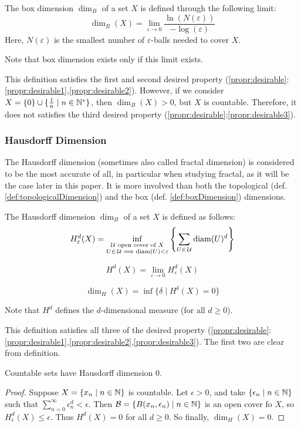 \begin{definition}\label{def:boxDimension}
	The box dimension $\dim_B$ of a set $X$ is defined through the following limit:
	$$
	\dim_B(X) = \lim_{\varepsilon \to 0} \frac{\ln(N(\varepsilon))}{-\log(\varepsilon)}
	$$
	Here, $N(\varepsilon)$ is the smallest number of $\varepsilon$-balls needed to cover $X$.
	
	Note that box dimension exists only if this limit exists.
\end{definition}

This definition satisfies the first and second desired property (\ref{propr:desirable}:\ref{propr:desirable1},\ref{propr:desirable2}).
However, if we consider $X = \{0\} \cup \{\frac{1}{n} \mid n \in \mathbb{N}^*\}$, then $\dim_B(X) > 0$, but $X$ is countable.
Therefore, it does not satisfies the third desired property (\ref{propr:desirable}:\ref{propr:desirable3}).

\subsubsection{Hausdorff Dimension}
The Hausdorff dimension (sometimes also called fractal dimension) is considered to be the most accurate of all, in particular when studying fractal, as it will be the case later in this paper.
It is more involved than both the topological (def. \ref{def:topologicalDimension}) and the box (def. \ref{def:boxDimension}) dimensions.

\begin{definition}\label{def:HausdorffDimension}
	The Hausdorff dimension $\dim_B$ of a set $X$ is defined as follows:
	$$
	H_{\varepsilon}^d(X) = 
	\inf_{\substack{\mathcal{U} \text{ open cover of } X\\
			U \in \, \mathcal{U} \implies \text{diam}(U) < \varepsilon}}
		\left\lbrace \sum_{U \in \, \mathcal{U}} \text{diam}(U)^d \right\rbrace
	$$
	
	$$
	H^d(X) = \lim_{\varepsilon \to 0} H_{\varepsilon}^d(X)
	$$
	
	$$
	\dim_H(X) = \inf \{ \delta \mid H^{\delta}(X) = 0 \}
	$$
	
	Note that $H^d$ defines the $d$-dimensional measure (for all $d \geq 0$).
\end{definition}

This definition satisfies all three of the desired property (\ref{propr:desirable}:\ref{propr:desirable1},\ref{propr:desirable2},\ref{propr:desirable3}).
The first two are clear from definition.
\begin{property}
	Countable sets have Hausdorff dimension 0.
\end{property}
\begin{proof}
	Suppose $X = \{ x_n \mid n \in \mathbb{N} \}$ is countable.
	Let $\epsilon > 0$, and take $\{ \epsilon_n \mid n \in \mathbb{N} \}$ such that $\sum_{n=0}^{\infty} \epsilon_n^d < \epsilon$.
	Then $\mathcal{B} = \{ B(x_n,\epsilon_n) \mid n \in \mathbb{N} \}$ is an open cover fo $X$, so $H_{\epsilon}^d(X) \leq \epsilon$.
	Thus $H^d(X) = 0$ for all $d \geq 0$.
	So finally, $\dim_H(X) = 0$.
\end{proof}

